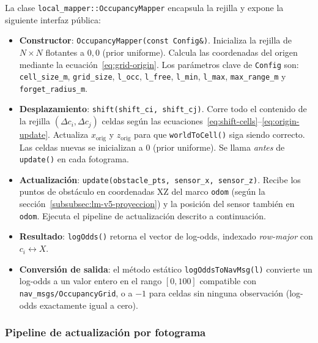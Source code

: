 La clase \texttt{local\_mapper::OccupancyMapper} encapsula la rejilla y
expone la siguiente interfaz pública:
%
\begin{itemize}
  \item \textbf{Constructor}: \texttt{OccupancyMapper(const Config\&)}.
    Inicializa la rejilla de $N \times N$ flotantes a $0{,}0$ (prior uniforme).
    Calcula las coordenadas del origen mediante la
    ecuación~\ref{eq:grid-origin}. Los parámetros clave de \texttt{Config}
    son: \texttt{cell\_size\_m}, \texttt{grid\_size}, \texttt{l\_occ},
    \texttt{l\_free}, \texttt{l\_min}, \texttt{l\_max}, \texttt{max\_range\_m}
    y \texttt{forget\_radius\_m}.

  \item \textbf{Desplazamiento}: \texttt{shift(shift\_ci, shift\_cj)}.
    Corre todo el contenido de la rejilla $(\Delta c_i, \Delta c_j)$ celdas
    según las ecuaciones~\ref{eq:shift-cells}--\ref{eq:origin-update}.
    Actualiza $x_{\text{orig}}$ y $z_{\text{orig}}$ para que
    \texttt{worldToCell()} siga siendo correcto. Las celdas nuevas se
    inicializan a $0$ (prior uniforme). Se llama \emph{antes} de
    \texttt{update()} en cada fotograma.

  \item \textbf{Actualización}: \texttt{update(obstacle\_pts, sensor\_x, sensor\_z)}.
    Recibe los puntos de obstáculo en coordenadas XZ del marco \texttt{odom}
    (según la sección~\ref{subsubsec:lm-v5-proyeccion}) y la posición del
    sensor también en \texttt{odom}. Ejecuta el pipeline de actualización
    descrito a continuación.

  \item \textbf{Resultado}: \texttt{logOdds()} retorna el vector de log-odds,
    indexado \emph{row-major} con $c_i \leftrightarrow X$.

  \item \textbf{Conversión de salida}: el método estático
    \texttt{logOddsToNavMsg(l)} convierte un log-odds a un valor entero en el
    rango $[0, 100]$ compatible con \texttt{nav\_msgs/OccupancyGrid}, o a
    $-1$ para celdas sin ninguna observación (log-odds exactamente igual a
    cero).
\end{itemize}

\subsubsection{Pipeline de actualización por fotograma}
\label{subsubsec:lm-v5-pipeline}


